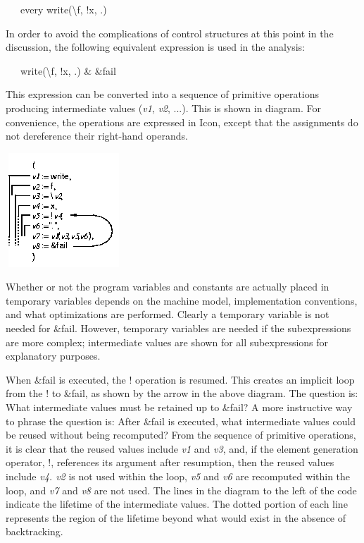 {\ttfamily\mdseries
\ \ \ every write({\textbackslash}f, !x, {\textquotedbl}.{\textquotedbl})}

In order to avoid the complications of control structures at this
point in the discussion, the following equivalent expression is used
in the analysis:

{\ttfamily\mdseries
\ \ \ write({\textbackslash}f, !x, {\textquotedbl}.{\textquotedbl}) \& \&fail}

This expression can be converted into a sequence of primitive
operations producing intermediate values (\textit{v1}, \textit{v2},
...). This is shown in diagram. For convenience, the operations are
expressed in Icon, except that the assignments do not dereference
their right-hand operands.

{\centering\color{green}
 \includegraphics[width=1.7252in,height=1.6866in]{kw/figure4-1.png}  
\par}

Whether or not the program variables and constants are actually placed
in temporary variables depends on the machine model, implementation
conventions, and what optimizations are performed. Clearly a temporary
variable is not needed for \&fail. However, temporary variables are
needed if the subexpressions are more complex; intermediate values are
shown for all subexpressions for explanatory purposes.

When \&fail is executed, the ! operation is resumed. This creates an
implicit loop from the ! to \&fail, as shown by the arrow in the above
diagram. The question is: What intermediate values must be retained up
to \&fail? A more instructive way to phrase the question is: After
\&fail is executed, what intermediate values could be reused without
being recomputed? From the sequence of primitive operations, it is
clear that the reused values include \textit{v1} and \textit{v3}, and,
if the element generation operator, !, references its argument after
resumption, then the reused values include \textit{v4. v2} is not used
within the loop, \textit{v5} and \textit{v6} are recomputed within the
loop, and \textit{v7} and \textit{v8} are not used. The lines in the
diagram to the left of the code indicate the lifetime of the
intermediate values. The dotted portion of each line represents the
region of the lifetime beyond what would exist in the absence of
backtracking.

